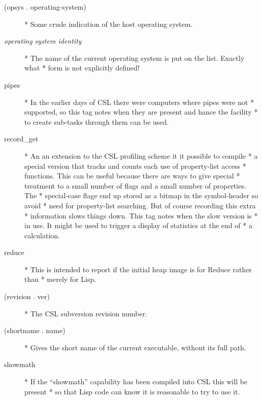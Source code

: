 \documentclass[a4paper,11pt]{article}
\begin{document}
\begin{description}
\item[{\ttfamily  (opsys . operating-system)}] 
      * Some crude indication of the host operating system.

\item [{\itshape operating system identity}] 
      * The name of the current operating system is put on the list. Exactly what
      * form is not explicitly defined!

\item[{\ttfamily pipes}] 
      * In the earlier days of CSL there were computers where pipes were not
      * supported, so this tag notes when they are present and hance the facility
      * to create sub-tasks through them can be used.

\item[{\ttfamily  record\_get}] 
      * An an extension to the CSL profiling scheme it it possible to compile
      * a special version that tracks and counts each use of property-list access
      * functions. This can be useful because there are ways to give special
      * treatment to a small number of flags and a small number of properties. The
      * special-case flage end up stored as a bitmap in the symbol-header so avoid
      * need for property-list searching. But of course recording this extra
      * information slows things down. This tag notes when the slow version is
      * in use. It might be used to trigger a display of statistics at the end of
      * a calculation.

\item[{\ttfamily reduce}] 
      * This is intended to report if the initial heap image is for Reduce rather than
      * merely for Lisp.

\item[{\ttfamily  (revision . ver)}] 
      * The CSL subversion revision number.

\item[{\ttfamily  (shortname . name)}] 
      * Gives the short name of the current executable, without its full path.

\item[{\ttfamily showmath}] 
      * If the ``showmath'' capability has been compiled into CSL this will be present
      * so that Lisp code can know it is reasonable to try to use it.


\end{description}
\end{document}
